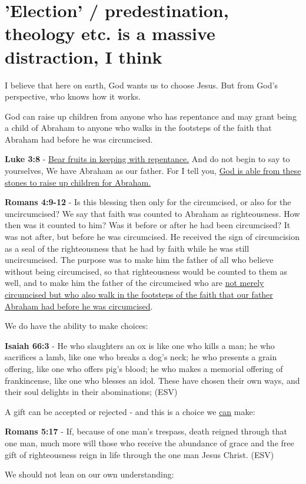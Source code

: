 \documentclass[11pt]{article}
\begin{document}
\section{'Election' / predestination, theology etc. is a massive distraction, I think}
\label{sec:org10d09e4}
I believe that here on earth, God wants us to choose Jesus. But from God's perspective, who knows how it works.

God can raise up children from anyone who has repentance and may grant being a child of Abraham to anyone who walks in the footsteps of the faith that Abraham had before he was circumcised.

\textbf{Luke 3:8} - \uline{Bear fruits in keeping with repentance.} And do not begin to say to yourselves, We have Abraham as our father. For I tell you, \uline{God is able from these stones to raise up children for Abraham.}

\textbf{Romans 4:9-12} - Is this blessing then only for the circumcised, or also for the uncircumcised? We say that faith was counted to Abraham as righteousness. How then was it counted to him? Was it before or after he had been circumcised? It was not after, but before he was circumcised. He received the sign of circumcision as a seal of the righteousness that he had by faith while he was still uncircumcised. The purpose was to make him the father of all who believe without being circumcised, so that righteousness would be counted to them as well, and to make him the father of the circumcised who are \uline{not merely circumcised but who also walk in the footsteps of the faith that our father Abraham had before he was circumcised}.

We do have the ability to make choices:

\textbf{Isaiah 66:3} - He who slaughters an ox is like one who kills a man; he who sacrifices a lamb, like one who breaks a dog's neck; he who presents a grain offering, like one who offers pig's blood; he who makes a memorial offering of frankincense, like one who blesses an idol. These have chosen their own ways, and their soul delights in their abominations; (ESV)

A gift can be accepted or rejected - and this is a choice we \uline{can} make:

\textbf{Romans 5:17} - If, because of one man's trespass, death reigned through that one man, much more will those who receive the abundance of grace and the free gift of righteousness reign in life through the one man Jesus Christ. (ESV)

We should not lean on our own understanding:
\end{document}

